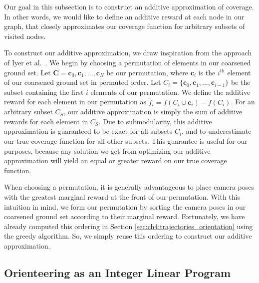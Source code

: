 Our goal in this subsection is to construct an additive approximation of coverage.
In other words, we would like to define an additive reward at each node in our graph, that closely approximates our coverage function for arbitrary subsets of visited nodes.

To construct our additive approximation, we draw inspiration from the approach of Iyer et al.~\cite{iyer:2013b,iyer:2013a}.
We begin by choosing a permutation of elements in our coarsened ground set.
Let $\mathbf{C} = \mathbf{c}_0, \mathbf{c}_1, \ldots, \mathbf{c}_N$ be our permutation, where $\mathbf{c}_i$ is the $i^{\text{th}}$ element of our coarsened ground set in permuted order.
Let $C_i = \{ \mathbf{c}_0, \mathbf{c}_1, \ldots, \mathbf{c}_{i-1} \}$ be the subset containing the first $i$ elements of our permutation.
We define the additive reward for each element in our permutation as $\tilde{f}_i = f(C_i \cup \mathbf{c}_i) - f(C_i)$.
For an arbitrary subset $C_S$, our additive approximation is simply the sum of additive rewards for each element in $C_S$. Due to submodularity, this additive approximation is guaranteed to be exact for all subsets $C_i$, and to underestimate our true coverage function for all other subsets.
This guarantee is useful for our purposes, because any solution we get from optimizing our additive approximation will yield an equal or greater reward on our true coverage function.

When choosing a permutation, it is generally advantageous to place camera poses with the greatest marginal reward at the front of our permutation.
With this intuition in mind, we form our permutation by sorting the camera poses in our coarsened ground set according to their marginal reward.
Fortunately, we have already computed this ordering in Section \ref{sec:ch4:trajectories_orientation} using the greedy algorithm.
So, we simply reuse this ordering to construct our additive approximation.

\subsection{Orienteering as an Integer Linear Program}
\label{sec:ch4:trajectories_ilp}

